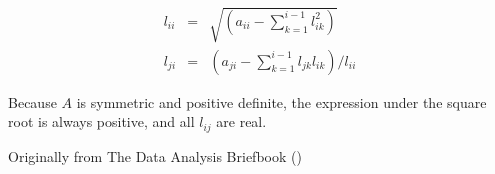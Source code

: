 \documentclass[12pt]{article}
\begin{document}
\begin{eqnarray*}
 l_{ii} & = & \sqrt{\left( a_{ii} - \sum_{k=1}^{i-1} l_{ik}^2 \right)} \\
 l_{ji} & = & \left(a_{ji} - \sum_{k=1}^{i-1} l_{jk} l_{ik} \right) / l_{ii}
\end{eqnarray*}

Because $A$ is symmetric and positive definite, the expression under the square root is always positive, and all $l_{ij}$ are real. 

\begin{thebibliography}{3}

 Originally from The Data Analysis Briefbook
()

\end{thebibliography}

\end{document}
